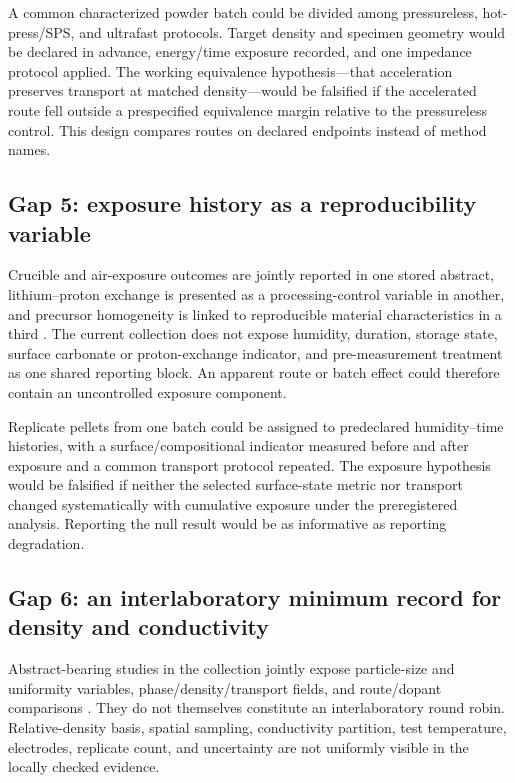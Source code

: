 A common characterized powder batch could be divided among pressureless, hot-press\slash SPS, and ultrafast protocols. Target density and specimen geometry would be declared in advance, energy\slash time exposure recorded, and one impedance protocol applied. The working equivalence hypothesis---that acceleration preserves transport at matched density---would be falsified if the accelerated route fell outside a prespecified equivalence margin relative to the pressureless control. This design compares routes on declared endpoints instead of method names.

\subsection{Gap 5: exposure history as a reproducibility variable}

Crucible and air-exposure outcomes are jointly reported in one stored abstract, lithium--proton exchange is presented as a processing-control variable in another, and precursor homogeneity is linked to reproducible material characteristics in a third \cite{xia2016ionic,rosen2021controlling,parascos2022compositional}. The current collection does not expose humidity, duration, storage state, surface carbonate or proton-exchange indicator, and pre-measurement treatment as one shared reporting block. An apparent route or batch effect could therefore contain an uncontrolled exposure component.

Replicate pellets from one batch could be assigned to predeclared humidity--time histories, with a surface\slash compositional indicator measured before and after exposure and a common transport protocol repeated. The exposure hypothesis would be falsified if neither the selected surface-state metric nor transport changed systematically with cumulative exposure under the preregistered analysis. Reporting the null result would be as informative as reporting degradation.

\subsection{Gap 6: an interlaboratory minimum record for density and conductivity}

Abstract-bearing studies in the collection jointly expose particle-size and uniformity variables, phase\slash density\slash transport fields, and route\slash dopant comparisons \cite{guo2023uniform,yan2020submicron,kosir2022comparative}. They do not themselves constitute an interlaboratory round robin. Relative-density basis, spatial sampling, conductivity partition, test temperature, electrodes, replicate count, and uncertainty are not uniformly visible in the locally checked evidence.


